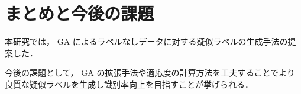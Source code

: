 \documentclass[a4paper,twoside,twocolumn,10pt]{jarticle}     %
\begin{document}
\section{まとめと今後の課題}
本研究では， GA によるラベルなしデータに対する疑似ラベルの生成手法の提案した．

今後の課題として， GA の拡張手法や適応度の計算方法を工夫することでより
良質な疑似ラベルを生成し識別率向上を目指すことが挙げられる．



\end{document}
